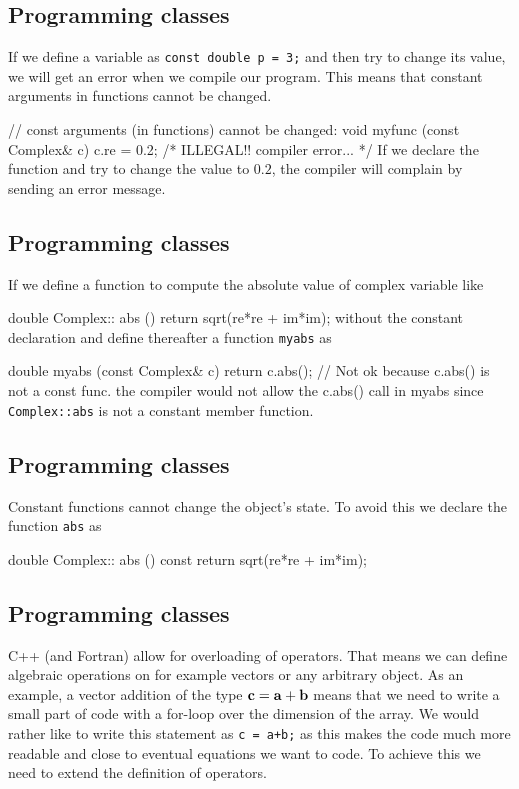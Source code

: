 \documentclass[%
oneside,                 %
final,                   %
10pt]{article}
\begin{document}
{{{{{{{{%
\subsection{Programming classes}

If we define a variable as
\Verb!const double p = 3;! and then try to change its value, we will get an error when we
compile our program. This means that constant arguments in functions cannot be changed.

\bcppcod
// const arguments (in functions) cannot be changed:
void myfunc (const Complex& c)
{ c.re = 0.2; /* ILLEGAL!! compiler error... */  }
\ecppcod
If we declare the function and try to change the value to $0.2$, the compiler will complain by sending
an error message.

\subsection{Programming classes}

If we define a function to compute the absolute value of complex variable like

\bcppcod
double Complex:: abs ()  { return sqrt(re*re + im*im);}
\ecppcod
without the constant declaration  and define thereafter a function
\Verb!myabs! as

\bcppcod
double myabs (const Complex& c)
{ return c.abs(); }   // Not ok because c.abs() is not a const func.
\ecppcod
the compiler would not allow the c.abs() call in myabs
since \Verb!Complex::abs! is not a constant member function.

\subsection{Programming classes}

Constant functions cannot change the object's state.
To avoid this we declare the function \Verb!abs! as

\bcppcod
double Complex:: abs () const { return sqrt(re*re + im*im); }
\ecppcod

\subsection{Programming classes}

C++ (and Fortran) allow for overloading of operators. That means we
can define algebraic operations on for example vectors or any
arbitrary object.  As an example, a vector addition of the type ${\bf
c} = {\bf a} + {\bf b}$ means that we need to write a small part of
code with a for-loop over the dimension of the array.  We would rather
like to write this statement as \Verb!c = a+b;! as this makes the code much
more readable and close to eventual equations we want to code.  To
achieve this we need to extend the definition of operators.

}}}}}}}}
\end{document}
